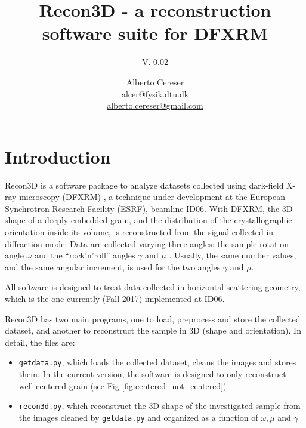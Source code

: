 \documentclass[11pt]{scrartcl}
\begin{document}
%
\author{Alberto Cereser\\  
\href{mailto:alcer@fysik.dtu.dk}{alcer@fysik.dtu.dk}\\
\href{mailto:alberto.cereser@gmail.com}{alberto.cereser@gmail.com}}
\title{Recon3D - a reconstruction software suite for DFXRM}
\subtitle{V. 0.02}
\maketitle

\tableofcontents

\section{Introduction}

Recon3D is a software package to analyze datasets collected using dark-field X-ray microscopy ({\footnotesize{DFXRM}}) {\cite{dfxrm_nat_comm}}, a technique under development at the European Synchrotron Research Facility ({\footnotesize{ESRF}}), beamline {\footnotesize{ID06}}. With {\footnotesize{DFXRM}}, the {\footnotesize{3D}} shape of a deeply embedded grain, and the distribution of the crystallographic orientation inside its volume, is reconstructed from the signal collected in diffraction mode. Data are collected varying three angles: the sample rotation angle $\omega$ and the ``rock'n'roll'' angles $\gamma$ and $\mu$ \cite{henning_joac}. Usually, the same number values, and the same angular increment, is used for the two angles $\gamma$ and $\mu$. 

All software is designed to treat data collected in horizontal scattering geometry, which is the one currently (Fall 2017) implemented at {\footnotesize{ID06}}.

Recon3D has two main programs, one to load, preprocess and store the collected dataset, and another to reconstruct the sample in {\footnotesize{3D}} (shape and orientation). In detail, the files are:
\begin{itemize}
    \item {\texttt{getdata.py}}, which loads the collected dataset, cleans the images and stores them. In the current version, the software is designed to only reconstruct well-centered grain (see Fig \ref{fig:centered_not_centered})
    \item {\texttt{recon3d.py}}, which reconstruct the {\footnotesize{3D}} shape of the investigated sample from the images cleaned by {\texttt{getdata.py}} and organized as a function of $\omega, \mu$ and $\gamma$
\end{itemize}
\end{document}
